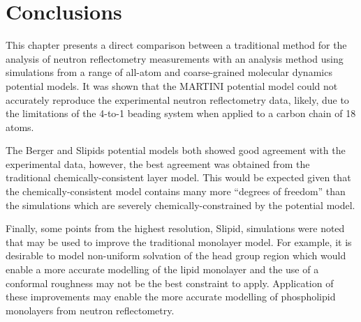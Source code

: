 \section{Conclusions}

This chapter presents a direct comparison between a traditional method for the analysis of neutron reflectometry measurements with an analysis method using simulations from a range of all-atom and coarse-grained molecular dynamics potential models.
It was shown that the MARTINI potential model could not accurately reproduce the experimental neutron reflectometry data, likely, due to the limitations of the 4-to-1 beading system when applied to a carbon chain of 18 atoms.

The Berger and Slipids potential models both showed good agreement with the experimental data, however, the best agreement was obtained from the traditional chemically-consistent layer model.
This would be expected given that the chemically-consistent model contains many more ``degrees of freedom'' than the simulations which are severely chemically-constrained by the potential model.

Finally, some points from the highest resolution, Slipid, simulations were noted that may be used to improve the traditional monolayer model.
For example, it is desirable to model non-uniform solvation of the head group region which would enable a more accurate modelling of the lipid monolayer and the use of a conformal roughness may not be the best constraint to apply.
Application of these improvements may enable the more accurate modelling of phospholipid monolayers from neutron reflectometry.
